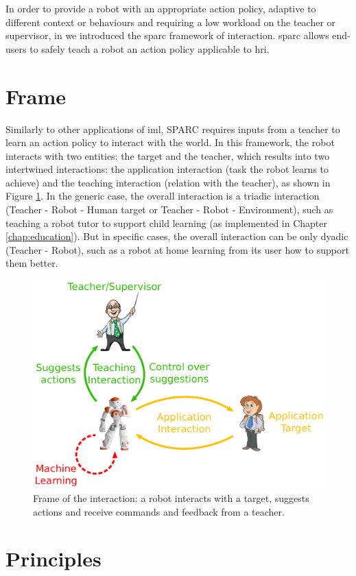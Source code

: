 In order to provide a robot with an appropriate action policy, adaptive to different context or behaviours and requiring a low workload on the teacher or supervisor, in \cite{senft2015sparc} we introduced the \acrfull{sparc} framework of interaction. \gls{sparc} allows end-users to safely teach a robot an action policy applicable to \gls{hri}.
\section{Frame}

Similarly to other applications of \gls{iml}, SPARC requires inputs from a teacher to learn an action policy to interact with the world. In this framework, the robot interacts with two entities: the target and the teacher, which results into two intertwined interactions: the application interaction (task the robot learns to achieve) and the teaching interaction (relation with the teacher), as shown in Figure \ref{fig:frame}. In the generic case, the overall interaction is a triadic interaction (Teacher - Robot - Human target or Teacher - Robot - Environment), such as teaching a robot tutor to support child learning (as implemented in Chapter \ref{chap:education}). But in specific cases, the overall interaction can be only dyadic (Teacher - Robot), such as a robot at home learning from its user how to support them better.

\begin{figure}[ht]
	\includegraphics[width=.8\linewidth]{frame.pdf}
	\centering
	\caption{Frame of the interaction: a robot interacts with a target, suggests actions and receive commands and feedback from a teacher.}
	\label{fig:frame}
\end{figure}

\section{Principles} \label{sec:sparc_principles}

